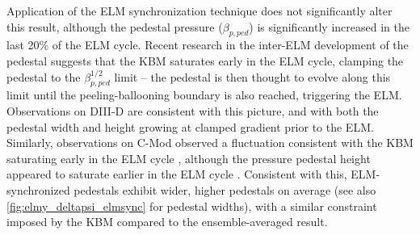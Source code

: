 \begin{figure}[t]
 \pushtooutside
\end{figure}

Application of the ELM synchronization technique does not significantly alter this result, although the pedestal pressure (\ie $\beta_{p,ped}$) is significantly increased in the last 20\% of the ELM cycle.  Recent research in the inter-ELM development of the pedestal suggests that the KBM saturates early in the ELM cycle, clamping the pedestal to the $\beta_{p,ped}^{1/2}$ limit -- the pedestal is then thought to evolve along this limit until the peeling-ballooning boundary is also reached, triggering the ELM.  Observations on DIII-D \cite{Snyder2012} are consistent with this picture, and with both the pedestal width and height growing at clamped gradient prior to the ELM.  Similarly, observations on C-Mod observed a fluctuation consistent with the KBM saturating early in the ELM cycle \cite{Diallo2014}, although the pressure pedestal height appeared to saturate earlier in the ELM cycle \cite{Hughes2013}.  Consistent with this, ELM-synchronized pedestals exhibit wider, higher pedestals on average (see also \cref{fig:elmy_deltapsi_elmsync} for pedestal widths), with a similar constraint imposed by the KBM compared to the ensemble-averaged result.  

